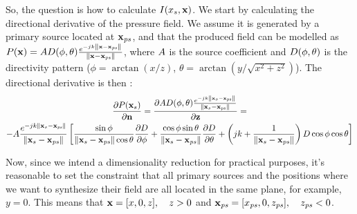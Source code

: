 So, the question is how to calculate $I(x_s, \PosTheo)$. We start by calculating the directional derivative of the pressure field. We assume it is generated by a primary source located at $\PosTheo[primarySource]$, and that the produced field can be modelled as $P(\PosTheo) = \coef \Diag(\phi, \theta) \GreenFunc[{\PosTheo - \PosTheo[primarySource]}]$, where $\coef$ is the source coefficient and $\Diag(\phi, \theta)$ is the directivity pattern ($\phi = \arctan(x/z)$, $\theta = \arctan(y/\sqrt{x^2 + z^2})$). The directional derivative is then \cite{Verheijen}:
\begin{multline}
\frac{\partial P(\PosTheo[surface])}{\partial \mathbf{n}} = \frac{\partial \coef \Diag(\phi, \theta) \GreenFunc[{\PosTheo[surface] - \PosTheo[primarySource]}]}{\partial \mathbf{z}} = \\ -A \GreenFunc[{\PosTheo[surface] - \PosTheo[primarySource]}] \left[ \frac{\sin\phi}{\norm{\PosTheo[surface] - \PosTheo[primarySource]}\cos\theta}\frac{\partial\Diag}{\partial\phi} + \frac{\cos\phi \sin\theta}{\norm{\PosTheo[surface] - \PosTheo[primarySource]}} \frac{\partial\Diag}{\partial\theta} + \left(jk + \frac{1}{\norm{\PosTheo[surface] - \PosTheo[primarySource]}}\right) \Diag \cos\phi \cos\theta \right]
\label{derivPressure}
\end{multline}


Now, since we intend a dimensionality reduction for practical purposes, it's reasonable to set the constraint that all primary sources and the positions where we want to synthesize their field are all located in the same plane, for example, $y = 0$. This means that $\PosTheo = [x, 0, z],\quad z > 0$ and $\PosTheo[primarySource] = [x_\mathit{ps}, 0, z_\mathit{ps}], \quad z_\mathit{ps} < 0$.

